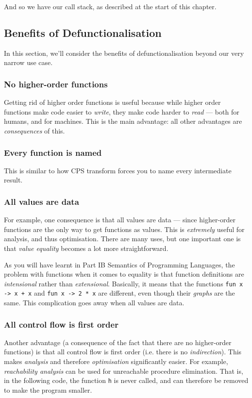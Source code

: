 And so we have our call stack, as described at the start of this chapter.

\subsection{Benefits of Defunctionalisation}\label{subsection:defun-benefits}
In this section, we'll consider the benefits of defunctionalisation beyond our very narrow use case.

\subsubsection{No higher-order functions}
Getting rid of higher order functions is useful because while higher order functions make code easier to \emph{write}, they make code harder to \emph{read} --- both for humans, and for machines. This is the main advantage: all other advantages are \emph{consequences} of this.

\subsubsection{Every function is named}
This is similar to how CPS transform forces you to name every intermediate result. 

\subsubsection{All values are data}
For example, one consequence is that all values are data --- since higher-order functions are the only way to get functions as values. This is \emph{extremely} useful for analysis, and thus optimisation. There are many uses, but one important one is that \emph{value equality} becomes a lot more straightforward. 

As you will have learnt in {\sffamily Part IB Semantics of Programming Languages}, the problem with functions when it comes to equality is that function definitions are \emph{intensional} rather than \emph{extensional}. Basically, it means that the functions \texttt{fun x -> x + x} and \texttt{fun x -> 2 * x} are different, even though their \emph{graphs} are the same. This complication goes away when all values are data.

\subsubsection{All control flow is first order}
Another advantage (a consequence of the fact that there are no higher-order functions) is that all control flow is first order (i.e. there is no \emph{indirection}). This makes \emph{analysis} and therefore \emph{optimisation} significantly easier. For example, \emph{reachability analysis} can be used for unreachable procedure elimination. That is, in the following code, the function \texttt{h} is never called, and can therefore be removed to make the program smaller.

